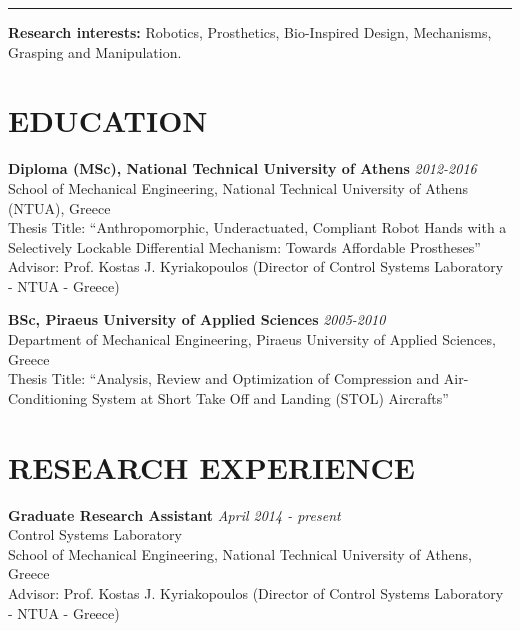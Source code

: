 \documentclass[11pt]{res} %
\begin{document}
\begin{resume}
\noindent\rule{16.6cm}{0.4pt}

\textbf{Research interests:} Robotics, Prosthetics, Bio-Inspired Design, Mechanisms, Grasping and Manipulation. 


\section{EDUCATION} 
\vspace{4pt} %
\small\textbf{Diploma (MSc), National Technical University of Athens} \hfill {\sl 2012-2016}
\\School of Mechanical Engineering, National Technical University of Athens (NTUA), Greece
\\Thesis Title: ``Anthropomorphic, Underactuated, Compliant Robot Hands with a Selectively Lockable Differential Mechanism: Towards Affordable Prostheses''
\\Advisor: Prof. Kostas J. Kyriakopoulos (Director of Control Systems Laboratory - NTUA - Greece)
 
\small\textbf{BSc, Piraeus University of Applied Sciences} \hfill {\sl 2005-2010}  
\\Department of Mechanical Engineering, Piraeus University of Applied Sciences, Greece 
\\Thesis Title: ``Analysis, Review and Optimization of Compression and Air-Conditioning System at Short Take Off and Landing (STOL) Aircrafts''
\vspace{0.1in} %
\section{RESEARCH EXPERIENCE}
\vspace{4pt} %
\small\textbf{Graduate Research Assistant} \hfill {\sl April 2014 - present}
\\Control Systems Laboratory
\\School of Mechanical Engineering, National Technical University of Athens, Greece
\\Advisor: Prof. Kostas J. Kyriakopoulos (Director of Control Systems Laboratory - NTUA - Greece)
 

\end{resume}
\end{document}

